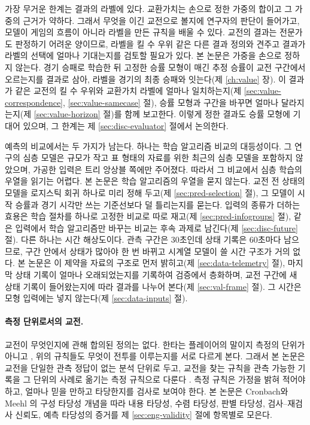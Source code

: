 가장 무거운 한계는 결과의 라벨에 있다. 교환가치는 손으로 정한 가중의 합이고 그 가중의 근거가 약하다. 그래서 무엇을 이긴 교전으로 볼지에 연구자의 판단이 들어가고, 모델이 게임의 흐름이 아니라 라벨을 만든 규칙을 배울 수 있다. 교전의 결과는 전문가도 판정하기 어려운 양이므로, 라벨을 킬 수 우위 같은 다른 결과 정의와 견주고 결과가 라벨의 선택에 얼마나 기대는지를 검토할 필요가 있다. 본 논문은 가중을 손으로 정하지 않는다. 경기 승패로 학습한 뒤 고정한 승률 모형이 매긴 추정 승률이 교전 구간에서 오르는지를 결과로 삼아, 라벨을 경기의 최종 승패와 잇는다(제 \ref{ch:value} 장). 이 결과가 같은 교전의 킬 수 우위와 교환가치 라벨에 얼마나 일치하는지(제 \ref{sec:value-correspondence}, \ref{sec:value-samecase} 절), 승률 모형과 구간을 바꾸면 얼마나 달라지는지(제 \ref{sec:value-horizon} 절)를 함께 보고한다. 이렇게 정한 결과도 승률 모형에 기대어 있으며, 그 한계는 제 \ref{sec:disc-evaluator} 절에서 논의한다.

예측의 비교에서는 두 가지가 남는다. 하나는 학습 알고리즘 비교의 대등성이다. 그 연구의 심층 모델은 규모가 작고 표 형태의 자료를 위한 최근의 심층 모델을 포함하지 않았으며, 가공한 입력은 트리 앙상블 쪽에만 주어졌다. 따라서 그 비교에서 심층 학습의 우열을 읽기는 어렵다. 본 논문은 학습 알고리즘의 우열을 묻지 않는다. 교전 전 상태의 모델을 로지스틱 회귀 하나로 미리 정해 두고(제 \ref{sec:pred-selection} 절), 그 모델이 시작 승률과 경기 시각만 쓰는 기준선보다 덜 틀리는지를 묻는다. 입력의 종류가 더하는 효용은 학습 절차를 하나로 고정한 비교로 따로 재고(제 \ref{sec:pred-infogroups} 절), 같은 입력에서 학습 알고리즘만 바꾸는 비교는 후속 과제로 남긴다(제 \ref{sec:disc-future} 절). 다른 하나는 시간 해상도이다. 관측 구간은 30초인데 상태 기록은 60초마다 남으므로, 구간 안에서 상태가 많아야 한 번 바뀌고 시계열 모델이 쓸 시간 구조가 거의 없다. 본 논문은 이 제약을 자료의 구조로 먼저 밝히고(제 \ref{sec:data-telemetry} 절), 마지막 상태 기록이 얼마나 오래되었는지를 기록하여 검증에서 층화하며, 교전 구간에 새 상태 기록이 들어왔는지에 따라 결과를 나누어 본다(제 \ref{sec:val-frame} 절). 그 시간은 모형 입력에는 넣지 않는다(제 \ref{sec:data-inputs} 절).

\paragraph{측정 단위로서의 교전.} 교전이 무엇인지에 관해 합의된 정의는 없다. 한타는 플레이어의 말이지 측정의 단위가 아니고 \cite{lolwiki2026terminology}, 위의 규칙들도 무엇이 전투를 이루는지를 서로 다르게 본다. 그래서 본 논문은 교전을 단일한 관측 정답이 없는 분석 단위로 두고, 교전을 찾는 규칙을 관측 가능한 기록을 그 단위의 사례로 옮기는 측정 규칙으로 다룬다 \cite{jacobs2021measurement}. 측정 규칙은 가정을 밝혀 적어야 하고, 얼마나 믿을 만하고 타당한지를 검사로 보여야 한다. 본 논문은 Cronbach와 Meehl \cite{cronbach1955construct}의 구성 타당성 개념을 따라 내용 타당성, 수렴 타당성, 판별 타당성, 검사--재검사 신뢰도, 예측 타당성의 증거를 제 \ref{sec:eng-validity} 절에 항목별로 모은다.
